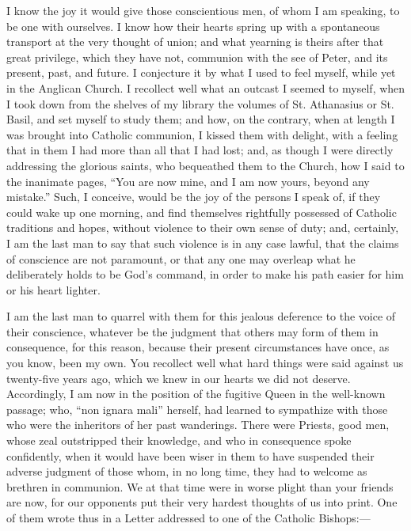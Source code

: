 I know the joy it would give those conscientious men, of whom I am
speaking, to be one with ourselves. I know how their hearts spring up
with a spontaneous transport at the very thought of union; and what
yearning is theirs after that great privilege, which they have not,
communion with the see of Peter, and its present, past, and future. I
conjecture it by what I used to feel myself, while yet in the Anglican
Church. I recollect well what an outcast I seemed to myself, when I took
down from the shelves of my library the volumes of St. Athanasius or St.
Basil, and set myself to study them; and how, on the contrary, when at
length I was brought into Catholic communion, I kissed them with
delight, with a feeling that in them I had more than all that I had
lost; and, as though I were directly addressing the glorious saints, who
bequeathed them to the Church, how I said to the inanimate pages,
``You are now mine, and I am now yours, beyond any mistake.''
Such, I conceive, would be the joy of the persons I speak of, if they
could wake up one morning, and find themselves rightfully possessed of
Catholic traditions and hopes, without violence to their own sense
of duty; and, certainly, I am the last man to say that such violence is
in any case lawful, that the claims of conscience are not paramount, or
that any one may overleap what he deliberately holds to be God's
command, in order to make his path easier for him or his heart lighter.

I am the last man to quarrel with them for this jealous deference to
the voice of their conscience, whatever be the judgment that others may
form of them in consequence, for this reason, because their present
circumstances have once, as you know, been my own. You recollect well
what hard things were said against us twenty-five years ago, which we
knew in our hearts we did not deserve. Accordingly, I am now in the
position of the fugitive Queen in the well-known passage; who, ``non
ignara mali'' herself, had learned to sympathize with those who were
the inheritors of her past wanderings. There were Priests, good men,
whose zeal outstripped their knowledge, and who in consequence spoke
confidently, when it would have been wiser in them to have suspended
their adverse judgment of those whom, in no long time, they had to
welcome as brethren in communion. We at that time were in worse plight
than your friends are now, for our opponents put their very hardest
thoughts of us into print. One of them wrote thus in a Letter addressed
to one of the Catholic Bishops:—

